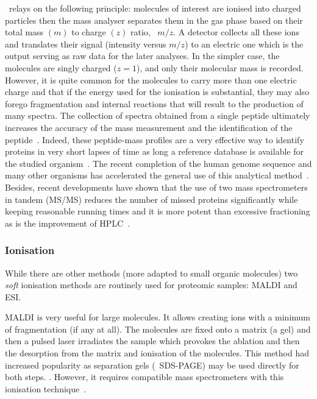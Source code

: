 \ms\ relays on the following principle: molecules of interest are ionised
into charged particles then the mass analyser separates them in the gas phase
based on their total mass $(m)$ to charge $(z)$ ratio, \ie\ $m/z$.
A detector collects all these ions and translates their signal (intensity versus
$m/z$) to an electric one which is the output serving as raw data for the
later analyses. In the simpler case, the molecules are singly charged ($z=1$),
and only their molecular mass is recorded. However, it is quite common for the
molecules to carry more than one electric charge and that if the energy used for
the ionisation is substantial, they may also forego fragmentation and internal
reactions that will result to the production of many spectra. The collection
of spectra obtained from a single peptide ultimately increases the accuracy of
the mass measurement and the identification of the peptide~.
Indeed, these peptide-mass profiles are a very effective way to identify
proteins in very short lapses of time as long a reference database is available
for the studied organism~. The recent completion of the human
genome sequence and many other organisms has accelerated the general use of this
analytical method~. Besides, recent developments have
shown that the use of two mass spectrometers in tandem (\gls{MS/MS}) reduces
the number of missed proteins significantly while keeping reasonable running
times and it is more potent than excessive fractioning as is the improvement
of \gls{HPLC}~.

\subsubsection{Ionisation}

While there are other methods (more adapted to small organic molecules)
two \emph{soft} ionisation methods are routinely used for proteomic samples:
\acrfull{MALDI} and \acrfull{ESI}.

\gls{MALDI} is very useful for large molecules. It allows creating ions with a
minimum of fragmentation (if any at all). The molecules are fixed onto a matrix
(a gel) and then a pulsed \gls{laser} irradiates the sample which provokes the
ablation and then the desorption from the matrix and ionisation of the molecules.
This method had increased popularity as separation gels (\eg\ \gls{SDS-PAGE})
may be used directly for both steps. .
However, it requires compatible mass spectrometers
with this ionisation technique~.

